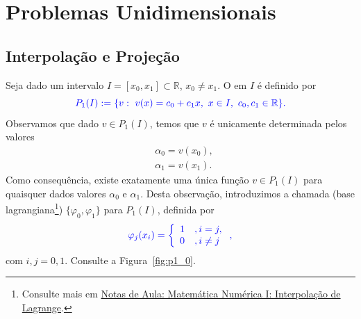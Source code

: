 
\chapter{Problemas Unidimensionais}\label{cap_mef1d}
\thispagestyle{fancy}

\section{Interpolação e Projeção}\label{cap_mef1d_sec_interproj}

Seja dado um intervalo $I = [x_0, x_1]\subset\mathbb{R}$, $x_0\neq x_1$. O  em $I$ é definido por
\begin{equation}\color{blue}P_1(I) := \{v: ~v(x)=c_0+c_1x,~x\in I,~c_0,c_1\in\mathbb{R}\}.
\end{equation}
Observamos que dado $v\in P_1(I)$, temos que $v$ é unicamente determinada pelos valores
\begin{equation}
  \begin{aligned}
    &\alpha_0 = v(x_0),\\
    &\alpha_1 = v(x_1).
  \end{aligned}
\end{equation}
Como consequência, existe exatamente uma única função $v\in P_1(I)$ para quaisquer dados valores $\alpha_0$ e $\alpha_1$. Desta observação, introduzimos a chamada  (base lagrangiana\footnote{Consulte mais em \href{https://notaspedrok.com.br/notas/MatematicaNumericaI/cap_interp_sec_lagrange.html}{Notas de Aula: Matemática Numérica I: Interpolação de Lagrange}.}) $\{\varphi_0, \varphi_1\}$ para $P_1(I)$, definida por
\begin{equation}\color{blue}\varphi_j(x_i) = \left\{
    \begin{array}{ll}
      1 &, i=j,\\
      0 &, i\neq j
    \end{array}
\right.,
\end{equation}
com $i,j=0, 1$. Consulte a Figura~\ref{fig:p1_0}.

